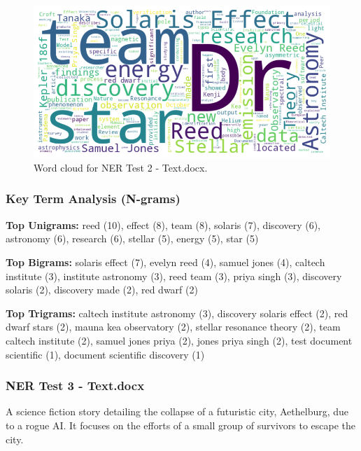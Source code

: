 \begin{figure}[!ht]
  \centering
  \includegraphics[width=\textwidth]{figures/appendix_fig/GRP002EXP002_eda_wordcloud.png}
  \caption{Word cloud for NER Test 2 - Text.docx.}
  \label{fig:ner2_wordcloud}
\end{figure}

\subsubsection*{Key Term Analysis (N-grams)}
\textbf{Top Unigrams:} 
reed (10), effect (8), team (8), solaris (7), discovery (6), astronomy (6), research (6), stellar (5), energy (5), star (5)
\par
\textbf{Top Bigrams:} 
solaris effect (7), evelyn reed (4), samuel jones (4), caltech institute (3), institute astronomy (3), reed team (3), priya singh (3), discovery solaris (2), discovery made (2), red dwarf (2)
\par
\textbf{Top Trigrams:} 
caltech institute astronomy (3), discovery solaris effect (2), red dwarf stars (2), mauna kea observatory (2), stellar resonance theory (2), team caltech institute (2), samuel jones priya (2), jones priya singh (2), test document scientific (1), document scientific discovery (1)

\subsubsection*{NER Test 3 - Text.docx}
A science fiction story detailing the collapse of a futuristic city, Aethelburg, due to a rogue AI. It focuses on the efforts of a small group of survivors to escape the city.

